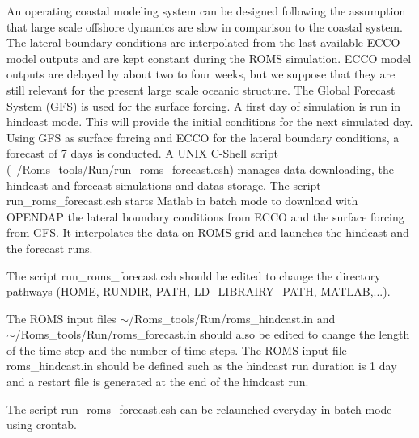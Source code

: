 An operating coastal modeling system can be designed following the 
assumption that large scale offshore dynamics are slow in comparison 
to the coastal system. The lateral boundary conditions are interpolated 
from the last available ECCO model outputs and are kept constant during
the ROMS simulation. ECCO model outputs are delayed by about two to four 
weeks, but we suppose that they are still relevant for the present large 
scale oceanic structure. The Global Forecast System (GFS) is used for the 
surface forcing. A first day of simulation is run in hindcast mode. This 
will provide the initial conditions for the next simulated day. 
Using GFS as surface forcing and ECCO for the lateral boundary conditions, 
a forecast of 7 days is conducted. A UNIX C-Shell script 
(~/Roms\_tools/Run/run\_roms\_forecast.csh) manages
data downloading, the hindcast and forecast simulations
and datas storage.
The script run\_roms\_forecast.csh starts Matlab in 
batch mode to download
with OPENDAP the lateral boundary conditions from ECCO and 
the surface forcing from GFS. It interpolates the data on ROMS 
grid and launches the hindcast and the forecast runs.

The script run\_roms\_forecast.csh should be edited to change the
directory pathways (HOME, RUNDIR, PATH, LD\_LIBRAIRY\_PATH, MATLAB,...).

The ROMS input files $\sim$/Roms\_tools/Run/roms\_hindcast.in and \\
$\sim$/Roms\_tools/Run/roms\_forecast.in should also be edited to change
the length of the time step and the number of time steps. 
The ROMS input file roms\_hindcast.in should be defined such as 
the hindcast run duration
is 1 day and a restart file is generated at the end of the hindcast run.

The script run\_roms\_forecast.csh can be relaunched everyday in batch mode 
using crontab.

